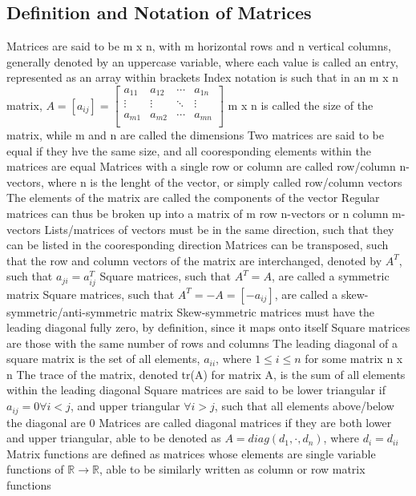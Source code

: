 \documentclass[11 pt, twoside]{article}
\newenvironment{outline*}
{
	\begin{outline}[enumerate]
	}
	{\end{outline}
}
\begin{document}
\subsection{Definition and Notation of Matrices}
\begin{outline*}
\1 Matrices are said to be m x n, with m horizontal rows and n vertical columns, generally denoted by an uppercase variable, where each value is called an entry, represented as an array within brackets
\2 Index notation is such that in an m x n matrix, $A = [a_{ij}] = \begin{bmatrix} a_{11} & a_{12} & \cdots & a_{1n} \\ \vdots & \vdots & \ddots & \vdots \\ a_{m1} & a_{m2} & \cdots &  a_{mn} \\ \end{bmatrix}$
\2 m x n is called the size of the matrix, while m and n are called the dimensions
\1 Two matrices are said to be equal if they hve the same size, and all cooresponding elements within the matrices are equal
\1 Matrices with a single row or column are called row/column n-vectors, where n is the lenght of the vector, or simply called row/column vectors
\2 The elements of the matrix are called the components of the vector
\2 Regular matrices can thus be broken up into a matrix of m row n-vectors or n column m-vectors
\2 Lists/matrices of vectors must be in the same direction, such that they can be listed in the cooresponding direction
\1 Matrices can be transposed, such that the row and column vectors of the matrix are interchanged, denoted by $A^T$, such that $a_{ji} = a_{ij}^T$
\2 Square matrices, such that $A^T = A$, are called a symmetric matrix
\2 Square matrices, such that $A^T = -A = [-a_{ij}]$, are called a skew-symmetric/anti-symmetric matrix
\3 Skew-symmetric matrices must have the leading diagonal fully zero, by definition, since it maps onto itself
\1 Square matrices are those with the same number of rows and columns
\2 The leading diagonal of a square matrix is the set of all elements, $a_{ii}$, where $1 \leq i \leq n$ for some matrix n x n
\3 The trace of the matrix, denoted tr(A) for matrix A, is the sum of all elements within the leading diagonal
\2 Square matrices are said to be lower triangular if $a_{ij} = 0 \forall i < j$, and upper triangular $\forall i > j$, such that all elements above/below the diagonal are 0
\3 Matrices are called diagonal matrices if they are both lower and upper triangular, able to be denoted as $A = diag(d_1, \cdot, d_n)$, where $d_i = d_{ii}$
\1 Matrix functions are defined as matrices whose elements are single variable functions of $\mathbb{R} \to \mathbb{R}$, able to be similarly written as column or row matrix functions
\end{outline*}
\end{document}

